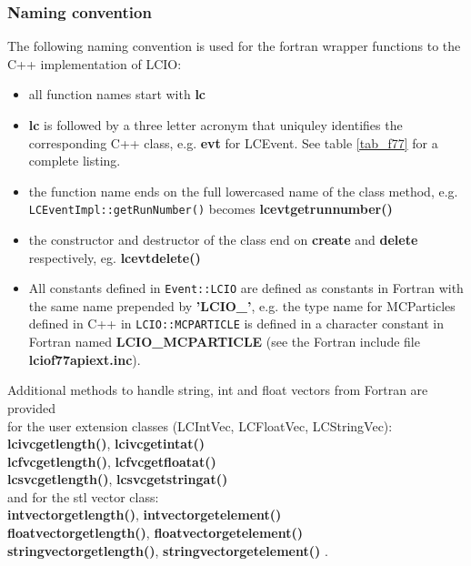 \subsubsection{Naming convention}
The following naming convention is used for the fortran wrapper functions to the 
C++ implementation of LCIO:
\begin{itemize}

\item{all function names start with {\bf lc}}

\item{{\bf lc} is followed by a three letter acronym that uniquley identifies the 
corresponding C++ class, e.g. {\bf evt} for LCEvent.} See table \ref{tab_f77} for a complete 
listing.

\item{the function name ends on the full lowercased name of the class method, e.g. \\
 \verb$LCEventImpl::getRunNumber()$ becomes  {\bf lcevtgetrunnumber() } }

\item{the constructor and destructor of the class  end on {\bf create} and {\bf delete} 
respectively, eg. {\bf lcevtdelete()} }

\item{All constants defined in \verb$Event::LCIO$ are defined as constants in Fortran with the 
same name prepended by {\bf 'LCIO\_'}, e.g. the type name for MCParticles defined in C++ in
\verb$LCIO::MCPARTICLE$ is defined in a character constant in Fortran named
{\bf LCIO\_MCPARTICLE} (see the Fortran include file {\bf lciof77apiext.inc}).}

\end{itemize}

Additional methods to handle string, int and float vectors from Fortran are provided\\

for the user extension classes (LCIntVec, LCFloatVec, LCStringVec):\\
{\bf lcivcgetlength()}, {\bf lcivcgetintat()}  \\
{\bf lcfvcgetlength()}, {\bf lcfvcgetfloatat()} \\
{\bf lcsvcgetlength()}, {\bf lcsvcgetstringat()}  \\

and for the stl vector class:\\
{\bf intvectorgetlength()}, {\bf intvectorgetelement()}  \\
{\bf floatvectorgetlength()}, {\bf floatvectorgetelement()}  \\
{\bf stringvectorgetlength()}, {\bf stringvectorgetelement()} . \\


